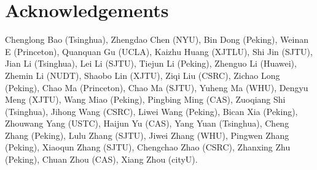 \documentclass{article}
\begin{document}
\newpage
\section{Acknowledgements}
Chenglong Bao (Tsinghua), Zhengdao Chen (NYU), Bin Dong (Peking), Weinan E (Princeton),  Quanquan Gu (UCLA), Kaizhu Huang (XJTLU), Shi Jin (SJTU), Jian Li (Tsinghua), Lei Li (SJTU), Tiejun Li (Peking),   Zhenguo Li (Huawei), Zhemin Li (NUDT), Shaobo Lin (XJTU), Ziqi Liu (CSRC),  Zichao Long (Peking), Chao Ma (Princeton),  Chao Ma (SJTU), Yuheng Ma (WHU),    Dengyu Meng (XJTU), Wang Miao (Peking),  Pingbing Ming (CAS), Zuoqiang Shi (Tsinghua), Jihong Wang (CSRC), Liwei Wang (Peking), Bican Xia (Peking), Zhouwang Yang (USTC),  Haijun Yu (CAS),  Yang Yuan  (Tsinghua),  Cheng Zhang (Peking),  Lulu Zhang (SJTU), Jiwei Zhang  (WHU),   Pingwen Zhang (Peking), Xiaoqun Zhang (SJTU),  Chengchao Zhao (CSRC), Zhanxing Zhu (Peking), Chuan Zhou (CAS),  Xiang Zhou (cityU).
\end{document}
